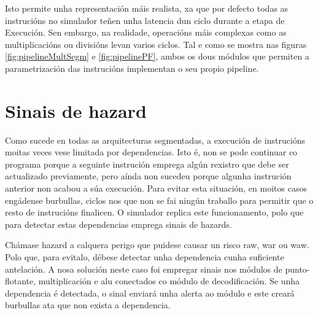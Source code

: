 Isto permite unha representación máis realista, xa que por defecto todas as instrucións no simulador teñen unha latencia dun ciclo durante a etapa de Execución. Sen embargo, na realidade, operacións máis complexas como as multiplicacións ou divisións levan varios ciclos. Tal e como se mostra nas figuras \ref{fig:pipelineMultSegm} e \ref{fig:pipelinePF}, ambos os dous módulos que permiten a parametrización das instrucións implementan o seu propio pipeline.

\section{Sinais de hazard}\label{sec:hazards}
Como sucede en todas as \gls{arquitecturas} segmentadas, a execución de instrucións moitas veces vese limitada por dependencias. Isto é, non se pode continuar co programa porque a seguinte instrución emprega algún rexistro que debe ser actualizado previamente, pero aínda non sucedeu porque algunha instrución anterior non acabou a súa execución. Para evitar esta situación, en moitos casos engádense burbullas, ciclos nos que non se fai ningún traballo para permitir que o resto de instrucións finalicen. O simulador replica este funcionamento, polo que para detectar estas dependencias emprega sinais de \gls{hazards}.

Chámase hazard a calquera perigo que puidese causar un risco \acrfull{raw}, \acrfull{war} ou \acrfull{waw}. Polo que, para evitalo, débese detectar unha dependencia cunha suficiente antelación. A nosa solución neste caso foi empregar sinais nos módulos de punto-flotante, multiplicación e \acrshort{alu} conectados co módulo de decodificación. Se unha dependencia é detectada, o sinal enviará unha alerta ao módulo e este creará burbullas ata que non exista a dependencia.